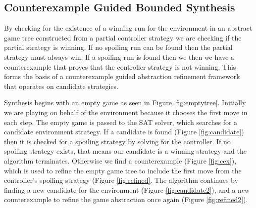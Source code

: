 \documentclass{llncs}
\begin{document}
\subsection{Counterexample Guided Bounded Synthesis}

By checking for the existence of a winning run for the environment in an
abstract game tree constructed from a partial controller strategy we are
checking if the partial strategy is winning. If no spoiling run can be found
then the partial strategy must always win. If a spoiling run is found then we
then we have a counterexample that proves that the controller strategy is not
winning. This forms the basis of a counterexample guided abstraction refinement
framework that operates on candidate strategies.

Synthesis begins with an empty game as seen in Figure \ref{fig:emptytree}.
Initially we are playing on behalf of the environment because it chooses the
first move in each step. The empty game is passed to the SAT solver, which
searches for a candidate environment strategy.  If a candidate is found (Figure
\ref{fig:candidate}) then it is checked for a spoiling strategy by solving for
the controller. If no spoiling strategy exists, that means our candidate is a
winning strategy and the algorithm terminates.  Otherwise we find a
counterexample (Figure \ref{fig:cex}), which is used to refine the empty game
tree to include the first move from the controller's spoiling strategy (Figure
\ref{fig:refined}.  The algorithm continues by finding a new candidate for the
environment (Figure \ref{fig:candidate2}), and a new counterexample to refine
the game abstraction once again (Figure \ref{fig:refined2}).
\end{document}
